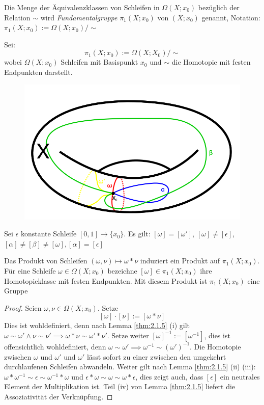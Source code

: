 \documentclass[a4paper,10pt]{scrartcl}
\begin{document}
\begin{df}
 Die Menge der Äquivalenzklassen von Schleifen in $\Omega(X;x_0)$ bezüglich der Relation $\sim$ wird \emph{Fundamentalgruppe} $\pi_1(X; x_0)$ von $(X;x_0)$ genannt, Notation: $\pi_1(X;x_0):= \Omega(X;x_0)/\sim$
\end{df}
Sei:
\[
 \pi_1(X;x_0):= \Omega(X;X_0)/\sim 
\]
wobei $\Omega(X;x_0)$ Schleifen mit Basispunkt $x_0$ und $\sim$ die Homotopie mit festen Endpunkten darstellt.\\
\begin{figure}[H]
\centering
\includegraphics[scale=0.3]{fig56.png}
\end{figure}
Sei $\epsilon$ konstante Schleife $[0,1]\to \{x_0\}$.
Es gilt: $[\omega]=[\omega']$, $[\omega]\neq [\epsilon]$, $[\alpha]\neq [\beta]\neq [\omega], [\alpha]=[\epsilon]$
\begin{st}
 Das Produkt von Schleifen $(\omega, \nu) \mapsto \omega * \nu$ induziert ein Produkt auf $\pi_1(X;x_0)$. Für 
eine Schleife $\omega \in \Omega(X;x_0)$ bezeichne $[\omega] \in \pi_1(X; x_0)$ ihre Homotopieklasse mit festen Endpunkten. Mit diesem Produkt ist $\pi_1(X;x_0)$ eine Gruppe
\end{st}
\begin{proof}
 Seien $\omega, \nu \in \Omega(X; x_0)$. Setze 
\[
 [\omega] \cdot [\nu]:=[\omega*\nu]
\]
Dies ist wohldefiniert, denn nach Lemma \ref{thm:2.1.5} (i) gilt $\omega \sim \omega' \land \nu \sim \nu' \implies \omega * \nu \sim \omega' * \nu'$. Setze weiter $[\omega]^{-1}:=[\omega^{-1}]$, dies ist offensichtlich wohldefiniert, denn $\omega \sim \omega' \implies \omega^{-1}\sim (\omega')^{-1}$. Die Homotopie zwischen $\omega$ und $\omega'$ und $\omega'$ lässt sofort zu einer zwischen den umgekehrt durchlaufenen Schleifen abwandeln. Weiter gilt nach Lemma \ref{thm:2.1.5} (ii) (iii): $\omega*\omega^{-1}\sim \epsilon \sim \omega^{-1}*\omega$ und $\epsilon*\omega\sim \omega \sim \omega*\epsilon$, dies zeigt auch, dass $[\epsilon]$ ein neutrales Element der Multiplikation ist. Teil (iv) von Lemma \ref{thm:2.1.5} liefert die Assoziativität der Verknüpfung. 
\end{proof}
\end{document}

